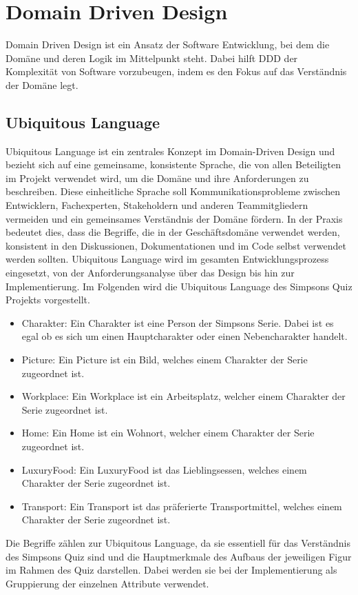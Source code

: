 \chapter{Domain Driven Design}
Domain Driven Design ist ein Ansatz der Software Entwicklung, bei dem die Domäne und deren Logik im Mittelpunkt steht. Dabei hilft DDD der Komplexität von Software vorzubeugen, indem es den Fokus auf das Verständnis der Domäne legt. \cite{ddd.2003}
\section{Ubiquitous Language}
Ubiquitous Language ist ein zentrales Konzept im Domain-Driven Design und bezieht sich auf eine gemeinsame, konsistente Sprache, die von allen Beteiligten im Projekt verwendet wird, um die Domäne und ihre Anforderungen zu beschreiben. Diese einheitliche Sprache soll Kommunikationsprobleme zwischen Entwicklern, Fachexperten, Stakeholdern und anderen Teammitgliedern vermeiden und ein gemeinsames Verständnis der Domäne fördern. In der Praxis bedeutet dies, dass die Begriffe, die in der Geschäftsdomäne verwendet werden, konsistent in den Diskussionen, Dokumentationen und im Code selbst verwendet werden sollten. Ubiquitous Language wird im gesamten Entwicklungsprozess eingesetzt, von der Anforderungsanalyse über das Design bis hin zur Implementierung.
Im Folgenden wird die Ubiquitous Language des Simpsons Quiz Projekts vorgestellt.
\begin{itemize}
    \item Charakter: Ein Charakter ist eine Person der Simpsons Serie. Dabei ist es egal ob es sich um einen Hauptcharakter oder einen Nebencharakter handelt.
    \item Picture: Ein Picture ist ein Bild, welches einem Charakter der Serie zugeordnet ist.
    \item Workplace: Ein Workplace ist ein Arbeitsplatz, welcher einem Charakter der Serie zugeordnet ist.
    \item Home: Ein Home ist ein Wohnort, welcher einem Charakter der Serie zugeordnet ist.
    \item LuxuryFood: Ein LuxuryFood ist das Lieblingsessen, welches einem Charakter der Serie zugeordnet ist.
    \item Transport: Ein Transport ist das präferierte  Transportmittel, welches einem Charakter der Serie zugeordnet ist.
\end{itemize}
Die Begriffe zählen zur Ubiquitous Language, da sie essentiell für das Verständnis des Simpsons Quiz sind und die Hauptmerkmale des Aufbaus der jeweiligen Figur im Rahmen des Quiz darstellen. Dabei werden sie bei der Implementierung als Gruppierung der einzelnen Attribute verwendet.
